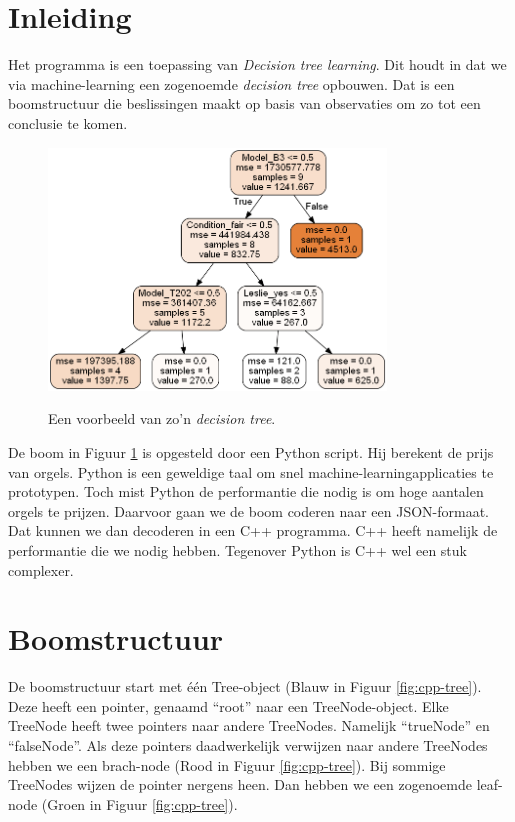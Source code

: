 \section{Inleiding}
Het programma is een toepassing van \textit{Decision tree learning}.\cite{wiki:dtl} Dit houdt in dat we via machine-learning een zogenoemde \textit{decision tree} opbouwen. Dat is een boomstructuur die beslissingen maakt op basis van observaties om zo tot een conclusie te komen.

\begin{figure}[ht]
    \centering
    \includegraphics[width=0.8\textwidth]{illustraties/tree}
    \caption{Een voorbeeld van zo'n \textit{decision tree}.}
    \cite{git:github}
    \label{fig:tree}
\end{figure}

De boom in Figuur \ref{fig:tree} is opgesteld door een Python script. Hij berekent de prijs van orgels. Python is een geweldige taal om snel machine-learningapplicaties te prototypen. Toch mist Python de performantie die nodig is om hoge aantalen orgels te prijzen. Daarvoor gaan we de boom coderen naar een JSON-formaat. Dat kunnen we dan decoderen in een C++ programma. C++ heeft namelijk de performantie die we nodig hebben. Tegenover Python is C++ wel een stuk complexer.

\clearpage

\section{Boomstructuur}
De boomstructuur start met één Tree-object (Blauw in Figuur \ref{fig:cpp-tree}). Deze heeft een pointer, genaamd ``root'' naar een TreeNode-object. Elke TreeNode heeft twee pointers naar andere TreeNodes. Namelijk ``trueNode'' en ``falseNode''. Als deze pointers daadwerkelijk verwijzen naar andere TreeNodes hebben we een brach-node (Rood in Figuur \ref{fig:cpp-tree}). Bij sommige TreeNodes wijzen de pointer nergens heen. Dan hebben we een zogenoemde leaf-node (Groen in Figuur \ref{fig:cpp-tree}).

